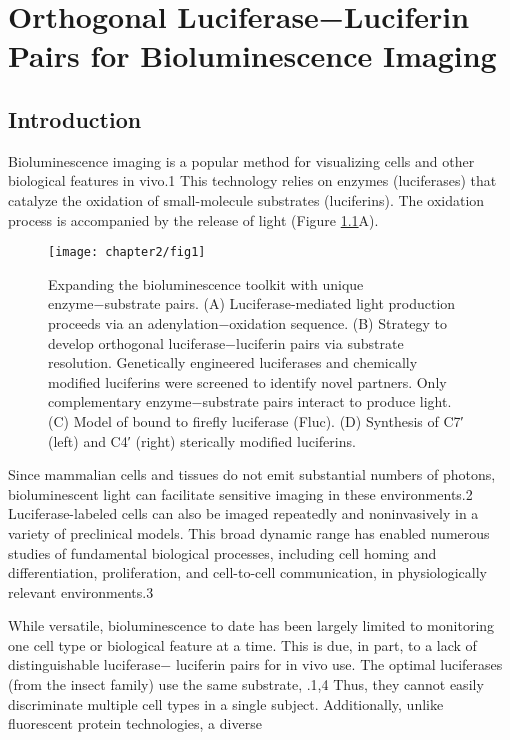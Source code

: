 \chapter{Orthogonal Luciferase−Luciferin Pairs for Bioluminescence Imaging}

\section{Introduction}
Bioluminescence imaging is a popular method for visualizing
cells and other biological features in vivo.1 This technology
relies on enzymes (luciferases) that catalyze the oxidation of
small-molecule substrates (luciferins). The oxidation process is
accompanied by the release of light (Figure \ref{fig:overview}A).
\begin{figure}[htbp]
\texttt{[image: chapter2/fig1]}
\centering
\caption[Expanding the bioluminescence toolkit with unique
enzyme−substrate pairs]{Expanding the bioluminescence toolkit with unique
enzyme−substrate pairs. (A) Luciferase-mediated light production
proceeds via an adenylation−oxidation sequence. (B) Strategy to
develop orthogonal luciferase−luciferin pairs via substrate resolution.
Genetically engineered luciferases and chemically modified luciferins
were screened to identify novel partners. Only complementary
enzyme−substrate pairs interact to produce light. (C) Model of \dluciferin{}
bound to firefly luciferase (Fluc). (D) Synthesis of C7′ (left)
and C4′ (right) sterically modified luciferins.}
  \label{fig:overview}
\end{figure}
Since
mammalian cells and tissues do not emit substantial numbers
of photons, bioluminescent light can facilitate sensitive imaging
in these environments.2 Luciferase-labeled cells can also be
imaged repeatedly and noninvasively in a variety of preclinical
models. This broad dynamic range has enabled numerous
studies of fundamental biological processes, including cell
homing and differentiation, proliferation, and cell-to-cell
communication, in physiologically relevant environments.3
\par
While versatile, bioluminescence to date has been largely
limited to monitoring one cell type or biological feature at a
time. This is due, in part, to a lack of distinguishable luciferase−
luciferin pairs for in vivo use. The optimal luciferases (from the
insect family) use the same substrate, \dluciferin{}.1,4 Thus, they
cannot easily discriminate multiple cell types in a single subject.
Additionally, unlike fluorescent protein technologies, a diverse

